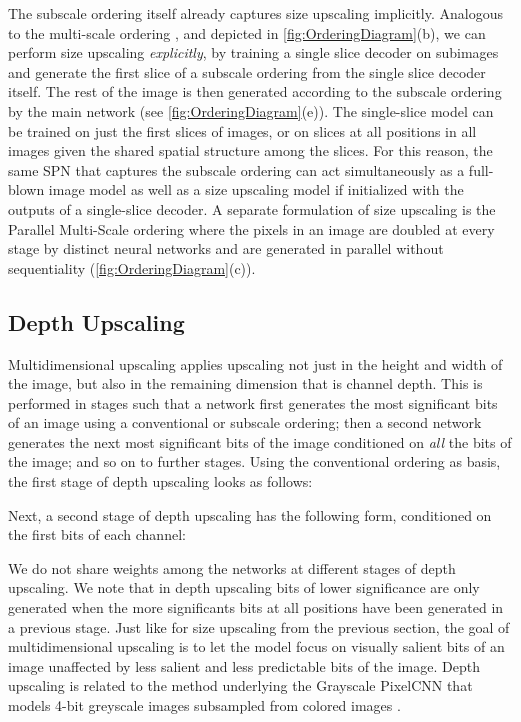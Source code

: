 \documentclass{article} \usepackage{iclr2019_conference,times}
\begin{document}
The subscale ordering itself already captures size upscaling implicitly. Analogous to the multi-scale ordering \citep{PixelRNN}, and depicted in \ref{fig:OrderingDiagram}(b), we can perform size upscaling \emph{explicitly}, by training a single slice decoder on subimages and generate the first slice of a subscale ordering from the single slice decoder itself. The rest of the image is then generated according to the subscale ordering by the main network (see \ref{fig:OrderingDiagram}(e)). The single-slice model can be trained on just the first slices of images, or on slices at all positions in all images given the shared spatial structure among the slices. For this reason, the same SPN that captures the subscale ordering can act simultaneously as a full-blown image model as well as a size upscaling model if initialized with the outputs of a single-slice decoder. A separate formulation of size upscaling is the Parallel Multi-Scale \citep{ParallelMultiscale} ordering where the pixels in an image are doubled at every stage by distinct neural networks and are generated in parallel without sequentiality (\ref{fig:OrderingDiagram}(c)).

\subsection{Depth Upscaling}

Multidimensional upscaling applies upscaling not just in the height and width of the image, but also in the remaining dimension that is channel depth. This is performed in stages such that a network first generates the  most significant bits of an image using a conventional or subscale ordering; then a second network generates the next  most significant bits of the image conditioned on \emph{all} the  bits of the image; and so on to further stages. Using the conventional ordering as basis, the first stage of depth upscaling looks as follows:

Next, a second stage of depth upscaling has the following form, conditioned on the first  bits of each channel:

We do not share weights among the networks at different stages of depth upscaling. We note that in depth upscaling bits of lower significance are only generated when the more significants bits at all positions have been generated in a previous stage. Just like for size upscaling from the previous section, the goal of multidimensional upscaling is to let the model focus on visually salient bits of an image unaffected by less salient and less predictable bits of the image. Depth upscaling is related to the method underlying the Grayscale PixelCNN that models 4-bit greyscale images subsampled from colored images \citet{greyscaling}.
\end{document}
